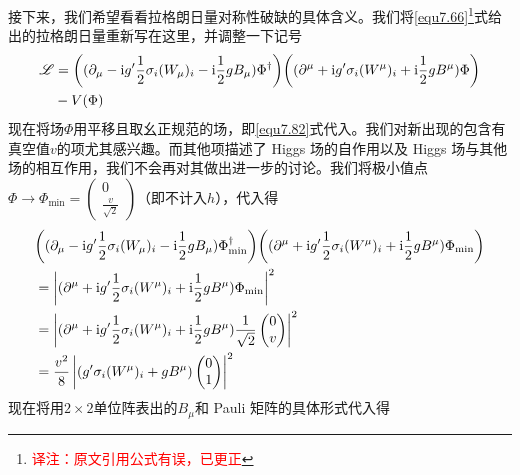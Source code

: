 接下来，我们希望看看拉格朗日量对称性破缺的具体含义。我们将\ref{equ7.66}\footnote{\textcolor{red}{译注：原文引用公式有误，已更正}}式给出的拉格朗日量重新写在这里，并调整一下记号
\begin{equation}
\label{equ7.83}
\begin{aligned}
{\mathscr L} &= \bigg( (\partial_\mu-\mathrm i g'\frac{1}{2}\sigma_i(W_\mu)_i-\mathrm i\frac{1}{2}gB_\mu)\Phi^\dag \bigg) \bigg( (\partial^\mu+\mathrm i g' \sigma_i(W^\mu)_i+\mathrm i\frac{1}{2}gB^\mu)\Phi \bigg)\\
 & -V(\Phi)
\end{aligned}
\end{equation}
现在将场$\Phi$用平移且取幺正规范的场，即\ref{equ7.82}式代入。我们对新出现的包含有真空值$v$的项尤其感兴趣。而其他项描述了 Higgs 场的自作用以及 Higgs 场与其他场的相互作用，我们不会再对其做出进一步的讨论。我们将极小值点$\Phi\rightarrow\Phi_{\min}= \begin{pmatrix}
0 \\\frac{v}{\sqrt{2}}
\end{pmatrix}$（即不计入$h$），代入得
\[
\begin{aligned}
& \bigg( (\partial_\mu-\mathrm i g'\frac{1}{2}\sigma_i(W_\mu)_i-\mathrm i\frac{1}{2}gB_\mu)\Phi^\dag_{\min} \bigg)  \bigg( (\partial^\mu+\mathrm i g'\frac{1}{2}\sigma_i(W^\mu)_i+\mathrm i\frac{1}{2}gB^\mu)\Phi_{\min} \bigg) \\
& = \left|(\partial^\mu+\mathrm i g'\frac{1}{2}\sigma_i(W^\mu)_i+\mathrm i\frac{1}{2}gB^\mu)\Phi_{\min}\right|^2 \\
& = \left|(\partial^\mu+\mathrm i g'\frac{1}{2}\sigma_i(W^\mu)_i+\mathrm i\frac{1}{2}gB^\mu)\frac{1}{\sqrt{2}}\begin{pmatrix}
0 \\ v
\end{pmatrix}\right|^2 \\
& = \frac{v^2}{8} \left|( g'\sigma_i(W^\mu)_i+gB^\mu)\begin{pmatrix} 0 \\ 1 \end{pmatrix}\right|^2
\end{aligned}
\]
现在将用$2\times 2$单位阵表出的$B_\mu$和 Pauli 矩阵的具体形式代入得
